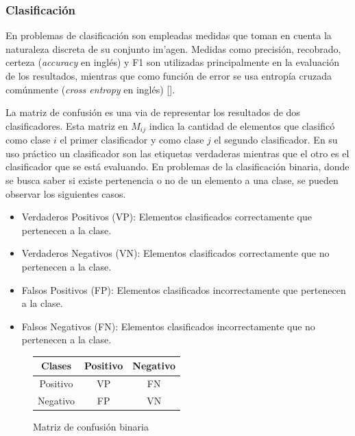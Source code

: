 \subsubsection{Clasificación}

En problemas de clasificación son empleadas medidas que toman en cuenta la naturaleza discreta de su conjunto im'agen.
Medidas como precisión, recobrado, certeza (\emph{accuracy} en inglés) y F1 son utilizadas principalmente en la 
evaluación de los resultados, mientras que como función de error se usa entropía cruzada comúnmente 
(\emph{cross entropy} en inglés) [\cite{grandini2020metrics}].

La matriz de confusión es una via de representar los resultados de dos clasificadores. Esta matriz en $M_{ij}$ 
indica la cantidad de elementos que clasificó como clase $i$ el primer clasificador y
como clase $j$ el segundo clasificador. En su uso práctico
un clasificador son las etiquetas verdaderas mientras que el otro es el clasificador que se está evaluando. 
En problemas de la clasificación binaria, donde se busca saber si existe pertenencia o no de un elemento a una clase,
se pueden observar los siguientes casos.

\begin{itemize}
	\item Verdaderos Positivos (VP): Elementos clasificados correctamente que pertenecen a la clase.
	\item Verdaderos Negativos (VN): Elementos clasificados correctamente que no pertenecen a la clase.
	\item Falsos Positivos (FP): Elementos clasificados incorrectamente que pertenecen a la clase.
	\item Falsos Negativos (FN): Elementos clasificados incorrectamente que no pertenecen a la clase.
\end{itemize}

\begin{figure}[h!]
	\begin{center}
		\begin{tabular}{|c|c|c|} \hline
		Clases		& Positivo	& Negativo  \\ \hline
		Positivo	& VP  		& FN		\\ \hline
		Negativo	& FP		& VN		\\ \hline
		\end{tabular}
	\caption{Matriz de confusión binaria}\label{fig:confusion_matrix}
	\end{center}
\end{figure}

